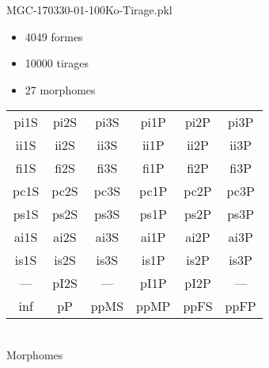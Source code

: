 MGC-170330-01-100Ko-Tirage.pkl
\begin{itemize}
\item 4049 formes
\item 10000 tirages
\item 27 morphomes
\end{itemize}
\begin{center}
\begin{tabular}{cccccc}
\hline
\cellcolor{white}pi1S & \cellcolor{white}pi2S & \cellcolor{white}pi3S & \cellcolor{white}pi1P & \cellcolor{white}pi2P & \cellcolor{white}pi3P\\
\cellcolor{brown}ii1S & \cellcolor{brown}ii2S & \cellcolor{brown}ii3S & \cellcolor{white}ii1P & \cellcolor{green}ii2P & \cellcolor{brown}ii3P\\
\cellcolor{white}fi1S & \cellcolor{lime}fi2S & \cellcolor{lime}fi3S & \cellcolor{green}fi1P & \cellcolor{white}fi2P & \cellcolor{white}fi3P\\
\cellcolor{yellow}pc1S & \cellcolor{yellow}pc2S & \cellcolor{yellow}pc3S & \cellcolor{lightgray}pc1P & \cellcolor{white}pc2P & \cellcolor{yellow}pc3P\\
\cellcolor{teal}ps1S & \cellcolor{teal}ps2S & \cellcolor{teal}ps3S & \cellcolor{yellow}ps1P & \cellcolor{white}ps2P & \cellcolor{teal}ps3P\\
\cellcolor{lightgray}ai1S & \cellcolor{lightgray}ai2S & \cellcolor{lightgray}ai3S & \cellcolor{lightgray}ai1P & \cellcolor{black}ai2P & \cellcolor{white}ai3P\\
\cellcolor{black}is1S & \cellcolor{black}is2S & \cellcolor{lightgray}is3S & \cellcolor{black}is1P & \cellcolor{black}is2P & \cellcolor{green}is3P\\
--- & \cellcolor{white}pI2S & --- & \cellcolor{white}pI1P & \cellcolor{white}pI2P & ---\\
\cellcolor{white}inf & \cellcolor{white}pP & \cellcolor{cyan}ppMS & \cellcolor{cyan}ppMP & \cellcolor{magenta}ppFS & \cellcolor{magenta}ppFP\\
\hline
\end{tabular}\\
Morphomes
\end{center}
\bigskip

